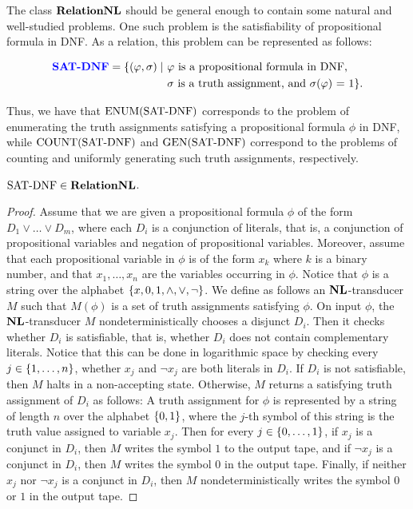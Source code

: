 \documentclass[11pt,twoside=off,numbers=noenddot]{scrbook}
\begin{document}
The class $\textbf{RelationNL}$ should be general enough to contain some natural and well-studied problems. One such problem is the satisfiability of propositional formula in DNF. As a relation, this problem can be represented as follows:

\begin{definition}
    \begin{align*}
        \textbf{\color{blue} \text{SAT-DNF}} = \{(\varphi, \sigma) \mid & \ \text{$\varphi$ is a propositional formula in DNF,}                 \\
                                                & \ \text{$\sigma$ is a truth assignment, and $\sigma(\varphi)$ = 1}\}.
    \end{align*}
\end{definition} 

Thus, we have that $\text{ENUM}(\text{SAT-DNF})$ corresponds to the problem of enumerating the truth assignments satisfying a propositional formula $\phi$ in DNF, while $\text{COUNT}(\text{SAT-DNF})$ and $\text{GEN}(\text{SAT-DNF})$ correspond to the problems of counting and uniformly generating such truth assignments, respectively.

\begin{lemma}
    $\text{SAT-DNF} \in \textbf{RelationNL}$.
\end{lemma}

\begin{proof}
    Assume that we are given a propositional formula $\phi$ of the form $D_1 \vee \dots \vee D_m$, where each $D_i$ is a conjunction of literals, that is, a conjunction of propositional variables and negation of propositional variables. Moreover, assume that each propositional variable in $\phi$ is of the form $x_k$ where $k$ is a binary number, and that $x_1, \dots, x_n$ are the variables occurring in $\phi$. Notice that $\phi$ is a string over the alphabet $\{ x, 0, 1, \wedge, \vee, \neg \}$. We define as follows an $\textbf{NL}$-transducer $M$ such that $M(\phi)$ is a set of truth assignments satisfying $\phi$. On input $\phi$, the $\textbf{NL}$-transducer $M$ nondeterministically chooses a disjunct $D_i$.  Then it checks whether $D_i$ is satisfiable, that is, whether $D_i$ does not contain complementary literals. Notice that this can be done in logarithmic space by checking every $j \in \{ 1, \dots, n \}$, whether $x_j$ and $\neg x_j$ are both literals in $D_i$. If $D_i$ is not satisfiable, then $M$ halts in a non-accepting state. Otherwise, $M$ returns a satisfying truth assignment of $D_i$ as follows: A truth assignment for $\phi$ is represented by a string of length $n$ over the alphabet $\{ 0, 1 \}$, where the $j$-th symbol of this string is the truth value assigned to variable $x_j$. Then for every $j \in \{ 0, \dots, 1 \}$, if $x_j$ is a conjunct in $D_i$, then $M$ writes the symbol $1$ to the output tape, and if $\neg x_j$ is a conjunct in $D_i$, then $M$ writes the symbol $0$ in the output tape. Finally, if neither $x_j$ nor $\neg x_j$ is a conjunct in $D_i$, then $M$ nondeterministically writes the symbol $0$ or $1$ in the output tape.
\end{proof}
\end{document}
